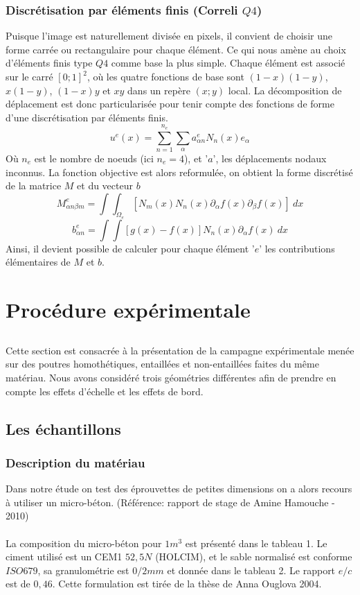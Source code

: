 \documentclass{DGC_M2_report}
\begin{document}
\section{Discrétisation par éléments finis (Correli $Q4$)}
Puisque l'image est naturellement divisée en pixels, il
convient de choisir une forme carrée ou rectangulaire pour chaque élément. Ce qui nous amène
au choix d'éléments finis type $Q4$ comme base la plus simple. Chaque élément est associé sur le
carré $[0 ; 1]^2$, où les quatre fonctions de base sont $(1-x)(1-y)$, $x(1-y)$, $(1-x)y$ et $xy$ dans un repère
$(x ; y)$ local. La décomposition de déplacement est donc particularisée pour tenir compte des
fonctions de forme d'une discrétisation par éléments finis.
\[u^e(x)=\sum_{n=1}^{n_e} \sum_{\alpha} a_{\alpha n}^{e}N_n(x)e_\alpha\]
Où $n_e$ est le nombre de noeuds (ici $n_e = 4$), et '$a$', les déplacements nodaux inconnus. La
fonction objective est alors reformulée, on obtient la forme discrétisé de la matrice $M$ et du
vecteur $b$
\[M_{\alpha n \beta m}^{e}=\int{\int_{\Omega_e} {[N_m(x)N_n(x)\partial_\alpha f(x)\partial_\beta f(x)]\ dx}}\]
\[b_{\alpha n}^{e}=\int{\int{[g(x)-f(x)]N_n(x)\partial_\alpha f(x)\ dx}}\]
Ainsi, il devient possible de calculer pour chaque élément '$e$' les contributions élémentaires
de $M$ et $b$.


\part{Procédure expérimentale}
\chapter*{}
Cette section est consacrée à la présentation de la campagne expérimentale menée sur des
poutres homothétiques, entaillées et non-entaillées faites du même matériau. Nous avons
considéré trois géométries différentes afin de prendre en compte les effets d'échelle et les effets
de bord.



\chapter{Les échantillons}
\section{Description du matériau}
Dans notre étude on test des éprouvettes de petites dimensions on a alors recours à utiliser un
micro-béton. (Référence: rapport de stage de Amine Hamouche - 2010)
\\\\
La composition du micro-béton pour $1m^3$ est présenté dans le tableau 1. Le ciment utilisé
est un CEM1 $52,5 N$ (HOLCIM), et le sable normalisé est conforme $ISO  679$, sa granulométrie
est $0/2 mm$ et donnée dans le tableau 2. Le rapport $e/c$ est de $0,46$. Cette formulation est tirée de
la thèse de Anna Ouglova 2004.
\end{document}
